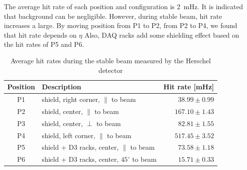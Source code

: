 The average hit rate of each position and configuration is 2~mHz. 
It is indicated that background can be negligible. 
However, during stable beam, hit rate increases a large.
By moving position from P1 to P2, from P2 to P4, we found that hit rate depends on $\eta$
Also, DAQ racks add some shielding effect based on the hit rates of P5 and P6.

\begin{table}
\begin{center}
\begin{tabular}{c|l|r}
  Position & \hspace{0.9cm}Description & Hit rate [mHz] \\
  \hline \hline
   P1 & shield, right corner, $\parallel$ to beam & $ 38.99 \pm 0.99 $\\ \hline
   P2 & shield, center, $\parallel$ to beam& $ 167.10 \pm 1.43$ \\ \hline
   P3 & shield, center, $\perp$ to beam& $ 82.81 \pm 1.55 $ \\ \hline
   P4 & shield, left corner, $\parallel$ to beam& $ 517.45 \pm 3.52 $ \\ \hline
   P5 & shield + D3 racks, center, $\parallel$ to beam& $ 73.58 \pm 1.18 $ \\ \hline
   P6 & shield + D3 racks, center, $45^\circ$ to beam& $ 15.71 \pm 0.33 $ \\ \hline
\end{tabular}
\caption{
    Average hit rates during the stable beam measured by the Herschel detector
}
\end{center}
\end{table}


